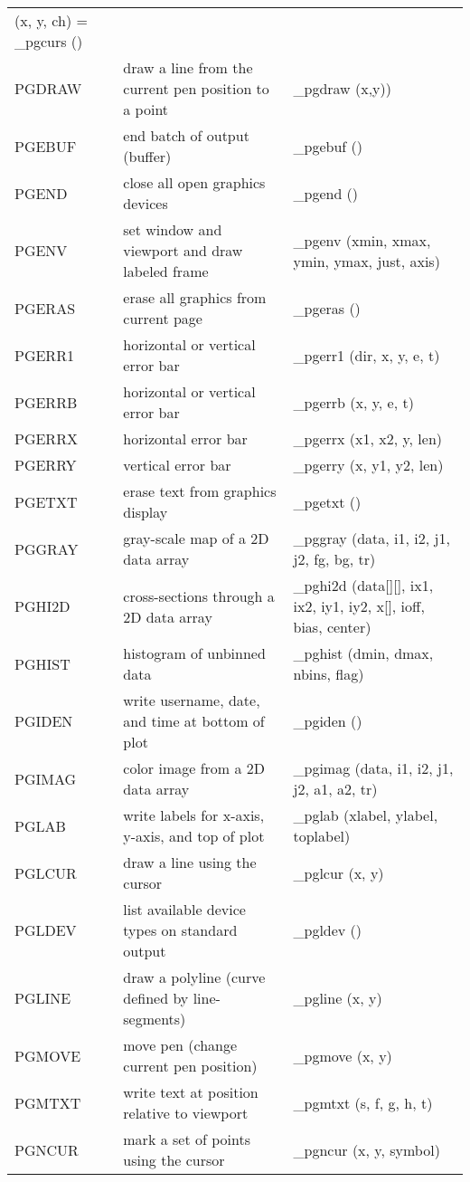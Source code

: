 \documentclass{book}
\begin{document}
{\begin{center}
\begin{tabular}{|l|p{2.5in}|p{2.25in}|}
(x, y, ch) = \_pgcurs () \\
PGDRAW & draw a line from the current pen position to a point           &
\_pgdraw (x,y)) \\
PGEBUF & end batch of output (buffer)                                   &
\_pgebuf () \\
PGEND & close all open graphics devices                                 &
\_pgend () \\
PGENV & set window and viewport and draw labeled frame                  &
\_pgenv (xmin, xmax, ymin, ymax, just, axis) \\
PGERAS & erase all graphics from current page                           &
\_pgeras () \\
PGERR1 & horizontal or vertical error bar                               &
\_pgerr1 (dir, x, y, e, t) \\
PGERRB & horizontal or vertical error bar                               &
\_pgerrb (x, y, e, t) \\
PGERRX & horizontal error bar                                           &
\_pgerrx (x1, x2, y, len) \\
PGERRY & vertical error bar                                             &
\_pgerry (x, y1, y2, len) \\
PGETXT & erase text from graphics display                               &
\_pgetxt () \\
PGGRAY & gray-scale map of a 2D data array                                     &
\_pggray (data, i1, i2, j1, j2, fg, bg, tr) \\
PGHI2D & cross-sections through a 2D data array                         &
\_pghi2d (data[][], ix1, ix2, iy1, iy2, x[], ioff, bias, center) \\
PGHIST & histogram of unbinned data                                     &
\_pghist (dmin, dmax, nbins, flag) \\
PGIDEN & write username, date, and time at bottom of plot               &
\_pgiden () \\
PGIMAG & color image from a 2D data array                                     &
\_pgimag (data, i1, i2, j1, j2, a1, a2, tr) \\
PGLAB & write labels for x-axis, y-axis, and top of plot                &
\_pglab (xlabel, ylabel, toplabel) \\
PGLCUR & draw a line using the cursor               &
\_pglcur (x, y) \\
PGLDEV & list available device types on standard output                 &
\_pgldev () \\
PGLINE & draw a polyline (curve defined by line-segments)               &
\_pgline (x, y) \\
PGMOVE & move pen (change current pen position)                         &
\_pgmove (x, y) \\
PGMTXT & write text at position relative to viewport                    &
\_pgmtxt (s, f, g, h, t) \\
PGNCUR & mark a set of points using the cursor               &
\_pgncur (x, y, symbol) \\
\hline
\end{tabular}


\end{center}}
\end{document}
